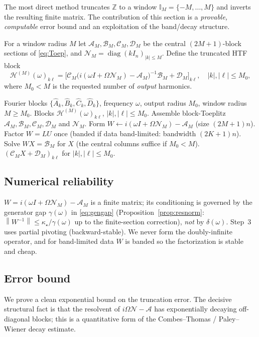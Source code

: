 \documentclass{amsart}
\theoremstyle{definition}
\DeclareMathOperator{\diag}{diag}
\newcommand{\Z}{\mathbb{Z}}
\newcommand{\norm}[1]{\left\lVert#1\right\rVert}
\newcommand{\Acal}{\mathcal{A}}
\newcommand{\Bcal}{\mathcal{B}}
\newcommand{\Ccal}{\mathcal{C}}
\newcommand{\Dcal}{\mathcal{D}}
\newcommand{\Hcal}{\mathcal{H}}
\newcommand{\Ncal}{\mathcal{N}}
\begin{document}
The most direct method truncates $\Z$ to a window
$\mathbb{I}_M=\{-M,\dots,M\}$ and inverts the resulting finite matrix. The
contribution of this section is a \emph{provable, computable} error bound and an
exploitation of the band/decay structure.

For a window radius $M$ let $\Acal_M,\Bcal_M,\Ccal_M,\Dcal_M$ be the central
$(2M{+}1)$-block sections of \eqref{eq:Toep}, and
$\Ncal_M=\diag(kI_n)_{|k|\le M}$. Define the truncated HTF block
\begin{equation}\label{eq:HTFtrunc}
\Hcal^{(M)}(\omega)_{k\ell}
=\big[\Ccal_M\big(i(\omega I+\Omega\Ncal_M)-\Acal_M\big)^{-1}\Bcal_M+\Dcal_M\big]_{k\ell},
\quad |k|,|\ell|\le M_0,
\end{equation}
where $M_0<M$ is the requested number of \emph{output} harmonics.

\begin{algorithm}[H]
\caption{Truncated harmonic-balance HTF at one frequency}\label{alg:trunc}
\begin{algorithmic}[1]
\Require Fourier blocks $\{\hat A_k,\hat B_k,\hat C_k,\hat D_k\}$, frequency $\omega$,
output radius $M_0$, window radius $M\ge M_0$.
\Ensure Blocks $\Hcal^{(M)}(\omega)_{k\ell}$, $|k|,|\ell|\le M_0$.
\State Assemble block-Toeplitz $\Acal_M,\Bcal_M,\Ccal_M,\Dcal_M$ and $\Ncal_M$.
\State Form $W\gets i(\omega I+\Omega\Ncal_M)-\Acal_M$ (size $(2M{+}1)n$).
\State Factor $W=LU$ once (banded if data band-limited: bandwidth $(2K{+}1)n$).
\State Solve $WX=\Bcal_M$ for $X$ (the central columns suffice if $M_0<M$).
\State \Return $(\Ccal_M X+\Dcal_M)_{k\ell}$ for $|k|,|\ell|\le M_0$.
\end{algorithmic}
\end{algorithm}

\subsection{Numerical reliability}
$W=i(\omega I+\Omega\Ncal_M)-\Acal_M$ is a finite matrix; its conditioning is
governed by the generator gap $\gamma(\omega)$ in \eqref{eq:gengap}
(Proposition~\ref{prop:resnorm}: $\norm{W^{-1}}\le\kappa_\star/\gamma(\omega)$ up to the finite-section correction), \emph{not} by $\delta(\omega)$. Step~3 uses partial pivoting
(backward-stable). We never form the doubly-infinite operator, and for
band-limited data $W$ is banded so the factorization is stable and cheap.

\subsection{Error bound}
We prove a clean exponential bound on the truncation error. The decisive
structural fact is that the resolvent of $i\Omega\Ncal-\Acal$ has
exponentially decaying off-diagonal blocks; this is a quantitative form of the
Combes--Thomas / Paley--Wiener decay estimate.
\end{document}
